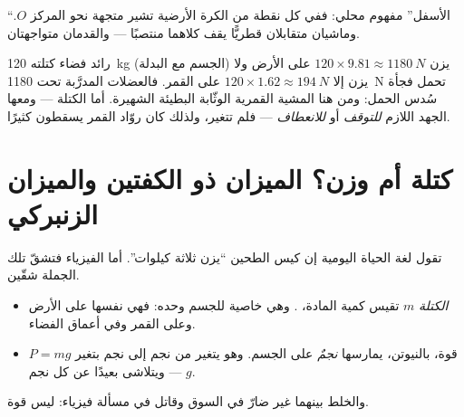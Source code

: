 \begin{omfigure}

{\small ``الأسفل'' مفهوم محلي: ففي كل نقطة من الكرة الأرضية تشير
متجهة  نحو المركز $O$. وماشيان متقابلان قطريًّا يقف كلاهما
منتصبًا --- والقدمان متواجهتان.}
\end{omfigure}

\begin{remark}\label{rem:g10:universal-gravitation:bounce}
رائد فضاء كتلته \qty{120}{kg} (الجسم مع البدلة) يزن
$120 \times 9.81 \approx \qty{1180}{N}$ على الأرض ولا يزن إلا
$120 \times 1.62 \approx \qty{194}{N}$ على القمر. فالعضلات المدرَّبة
تحت \qty{1180}{N} تحمل فجأة سُدس الحمل: ومن هنا
المشية القمرية الوثّابة البطيئة الشهيرة. أما الكتلة --- ومعها الجهد
اللازم \emph{للتوقف} أو \emph{للانعطاف} --- فلم تتغير، ولذلك
كان روّاد القمر يسقطون كثيرًا.
\end{remark}

\section{كتلة أم وزن؟ الميزان ذو الكفتين والميزان الزنبركي}

تقول لغة الحياة اليومية إن كيس الطحين ``يزن ثلاثة كيلوات''. أما الفيزياء
فتشقّ تلك الجملة شقّين.

\begin{remark}\label{rem:g10:universal-gravitation:massweight}
\begin{itemize}
  \item \emph{الكتلة} $m$ تقيس كمية المادة،
        . وهي خاصية للجسم وحده: فهي نفسها على
        الأرض وعلى القمر وفي أعماق الفضاء.
  \item \emph{} $P = mg$ قوة، بالنيوتن، يمارسها
        \emph{نجمٌ} على الجسم. وهو يتغير من نجم إلى نجم
        بتغير $g$ --- ويتلاشى بعيدًا عن كل نجم.
\end{itemize}
والخلط بينهما غير ضارّ في السوق وقاتل في مسألة
فيزياء:  ليس  قوة.
\end{remark}

